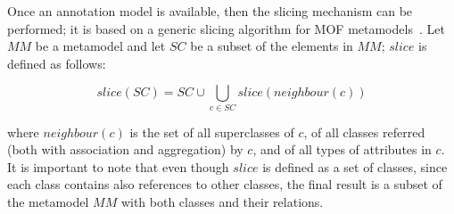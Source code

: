 Once an annotation model is available, then the slicing mechanism can be performed;
it is based on a generic slicing algorithm for MOF metamodels~\cite{ICSEbyadl}. Let
$MM$ be a metamodel and let $SC$ be a subset of the elements in
$MM$; $slice$ is defined as follows:

\vspace{-.2cm}
$$slice(SC)=SC \cup \displaystyle\bigcup_{c \in
SC}{slice(neighbour(c))}$$
\vspace{-.2cm}

\noindent where $neighbour(c)$ is the set of all superclasses of
$c$, of all classes referred (both with association and
aggregation) by $c$, and of all types of attributes in $c$. 
It is important to note that even though $slice$ is defined
as a set of classes, since each class contains also references
to other classes, the final result is a subset of the metamodel $MM$
with both classes and their relations.
%
